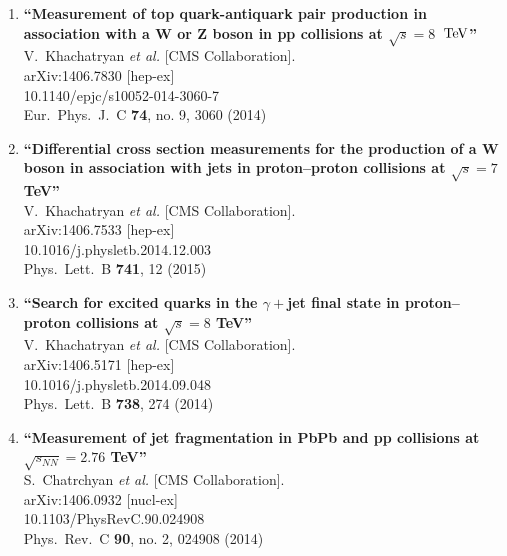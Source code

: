 \documentclass{article}
\begin{document}
\begin{enumerate}
\item%
{\bf ``Measurement of top quark-antiquark pair production in association with a W or Z boson in pp collisions at $\sqrt{s} = 8$ $\,\rm  {TeV}$''}
  \\{}V.~Khachatryan {\it et al.}  [CMS Collaboration].
  \\{}arXiv:1406.7830 [hep-ex]
    \\{}10.1140/epjc/s10052-014-3060-7
\\{}Eur.\ Phys.\ J.\ C {\bf 74}, no. 9, 3060 (2014) %


\item%
{\bf ``Differential cross section measurements for the production of a W boson in association with jets in proton–proton collisions at $\sqrt s=7$ TeV''}
  \\{}V.~Khachatryan {\it et al.}  [CMS Collaboration].
  \\{}arXiv:1406.7533 [hep-ex]
    \\{}10.1016/j.physletb.2014.12.003
\\{}Phys.\ Lett.\ B {\bf 741}, 12 (2015) %


\item%
{\bf ``Search for excited quarks in the $\gamma +$jet final state in proton–proton collisions at $\sqrt s=8$ TeV''}
  \\{}V.~Khachatryan {\it et al.}  [CMS Collaboration].
  \\{}arXiv:1406.5171 [hep-ex]
    \\{}10.1016/j.physletb.2014.09.048
\\{}Phys.\ Lett.\ B {\bf 738}, 274 (2014) %


\item%
{\bf ``Measurement of jet fragmentation in PbPb and pp collisions at $\sqrt{s_{NN}}=2.76$ TeV''}
  \\{}S.~Chatrchyan {\it et al.}  [CMS Collaboration].
  \\{}arXiv:1406.0932 [nucl-ex]
    \\{}10.1103/PhysRevC.90.024908
\\{}Phys.\ Rev.\ C {\bf 90}, no. 2, 024908 (2014) %



\end{enumerate}
\end{document}

